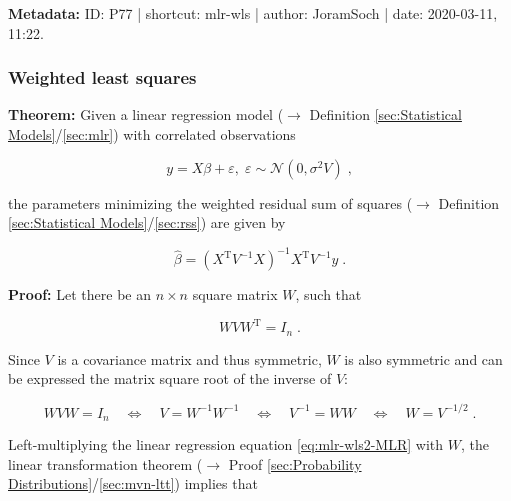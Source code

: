 \documentclass[a4paper,12pt,twoside]{book}
\begin{document}
\vspace{1em}
\textbf{Metadata:} ID: P77 | shortcut: mlr-wls | author: JoramSoch | date: 2020-03-11, 11:22.
\vspace{1em}



\subsubsection[\textbf{Weighted least squares}]{Weighted least squares} \label{sec:mlr-wls2}
\setcounter{equation}{0}

\textbf{Theorem:} Given a linear regression model ($\rightarrow$ Definition \ref{sec:Statistical Models}/\ref{sec:mlr}) with correlated observations

\begin{equation} \label{eq:mlr-wls2-MLR}
y = X\beta + \varepsilon, \; \varepsilon \sim \mathcal{N}(0, \sigma^2 V) \; ,
\end{equation}

the parameters minimizing the weighted residual sum of squares ($\rightarrow$ Definition \ref{sec:Statistical Models}/\ref{sec:rss}) are given by

\begin{equation} \label{eq:mlr-wls2-WLS}
\hat{\beta} = (X^\mathrm{T} V^{-1} X)^{-1} X^\mathrm{T} V^{-1} y \; .
\end{equation}


\vspace{1em}
\textbf{Proof:} Let there be an $n \times n$ square matrix $W$, such that

\begin{equation} \label{eq:mlr-wls2-W-def}
W V W^\mathrm{T} = I_n \; .
\end{equation}

Since $V$ is a covariance matrix and thus symmetric, $W$ is also symmetric and can be expressed the matrix square root of the inverse of $V$:

\begin{equation} \label{eq:mlr-wls2-W-V}
W V W = I_n \quad \Leftrightarrow \quad V = W^{-1} W^{-1} \quad \Leftrightarrow \quad V^{-1} = W W \quad \Leftrightarrow \quad W = V^{-1/2} \; .
\end{equation}

Left-multiplying the linear regression equation \eqref{eq:mlr-wls2-MLR} with $W$, the linear transformation theorem ($\rightarrow$ Proof \ref{sec:Probability Distributions}/\ref{sec:mvn-ltt}) implies that
\end{document}
